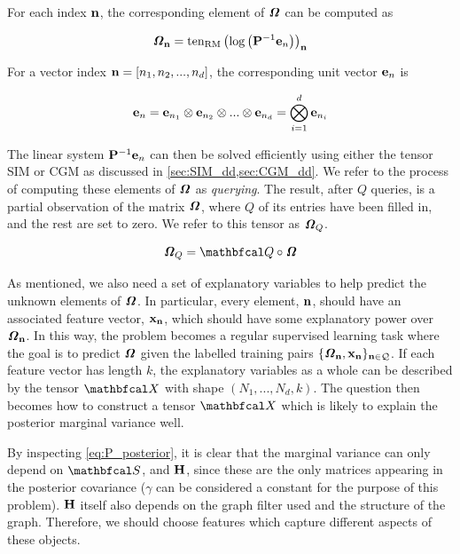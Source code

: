 For each index $\mathbf{n}$, the corresponding element of $\bm{\mathit{\Omega}}$ can be computed as 

\begin{equation}
    \bm{\mathit{\Omega}}_{\mathbf{n}} = \text{\textup{ten}}_{\text{\textup{RM}}}\left(\log \left( \mathbf{P}^{-1} \mathbf{e}_n \right)\right)_{\mathbf{n}}
\end{equation}

For a vector index $\mathbf{n} = [n_1, n_2, ..., n_d]$, the corresponding unit vector $\mathbf{e}_n$ is 

\begin{equation}
\mathbf{e}_n = \mathbf{e}_{n_1} \otimes \mathbf{e}_{n_2} \otimes ... \otimes \mathbf{e}_{n_d} = \bigotimes_{i=1}^d \mathbf{e}_{n_i}
\end{equation}

The linear system $\mathbf{P}^{-1} \mathbf{e}_n$ can then be solved efficiently using either the tensor SIM or CGM as discussed in \cref{sec:SIM_dd,sec:CGM_dd}. We refer to the process of computing these elements of $\bm{\mathit{\Omega}}$ as \textit{querying}. The result, after $Q$ queries, is a partial observation of the matrix $\bm{\mathit{\Omega}}$, where $Q$ of its entries have been filled in, and the rest are set to zero. We refer to this tensor as $\bm{\mathit{\Omega}}_Q$. 


\begin{equation}
    \Omegat_Q = \Qt \circ \Omegat
\end{equation}

As mentioned, we also need a set of explanatory variables to help predict the unknown elements of $\bm{\mathit{\Omega}}$. In particular, every element, $\mathbf{n}$, should have an associated feature vector, $\mathbf{x}_{\mathbf{n}}$, which should have some explanatory power over $\bm{\mathit{\Omega}}_{\mathbf{n}}$. In this way, the problem becomes a regular supervised learning task where the goal is to predict $\bm{\mathit{\Omega}}$ given the labelled training pairs $\{\bm{\mathit{\Omega}}_{\mathbf{n}}, \mathbf{x}_{\mathbf{n}}\}_{\mathbf{n} \in \mathcal{Q}}$. If each feature vector has length $k$, the explanatory variables as a whole can be described by the tensor $\Xt$ with shape $(N_1, ..., N_d, k)$. The question then becomes how to construct a tensor $\Xt$ which is likely to explain the posterior marginal variance well. 

By inspecting \cref{eq:P_posterior}, it is clear that the marginal variance can only depend on $\St$, and $\mathbf{H}$, since these are the only matrices appearing in the posterior covariance ($\gamma$ can be considered a constant for the purpose of this problem). $\mathbf{H}$ itself also depends on the graph filter used and the structure of the graph. Therefore, we should choose features which capture different aspects of these objects. 

